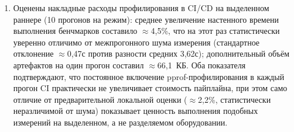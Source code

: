\begin{enumerate}
\item Оценены накладные расходы профилирования в CI/CD на выделенном
раннере (10 прогонов на режим): среднее увеличение настенного времени
выполнения бенчмарков составило $\approx$4,5\%, что на этот раз
статистически уверенно отличимо от межпрогонного шума измерения
(стандартное отклонение $\approx$0,47с против разности средних 3,62с);
дополнительный объём артефактов на один прогон составил
$\approx$66,1~КБ. Оба показателя подтверждают, что постоянное включение
pprof-профилирования в каждый прогон CI практически не увеличивает
стоимость пайплайна, при этом само отличие от предварительной локальной
оценки ($\approx$2,2\%, статистически неразличимой от шума) показывает
ценность выполнения подобных измерений на выделенном, а не разделяемом
оборудовании.
\end{enumerate}
